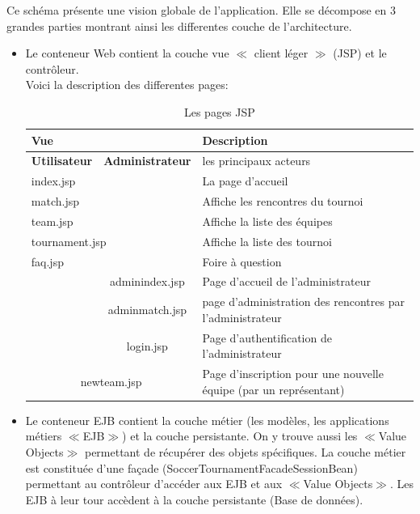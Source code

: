 \documentclass[10pt]{report}
\begin{document}
Ce schéma présente une vision globale de l'application. Elle se décompose en 3 grandes parties montrant ainsi les differentes couche de l'architecture.
\begin{itemize}
 \item Le conteneur Web contient la couche vue $\ll$ client léger $\gg$ (JSP) et le contrôleur.\\
 Voici la description des differentes pages:
 
\begin{table}[here]
    \begin{center}
	\begin{tabular}{|c|c|l|}
	\hline
	\multicolumn{2}{|l|}{\textbf{Vue}} & \textbf{Description}  \\
	\hline
	\textbf{Utilisateur}	& \textbf{Administrateur}& les principaux acteurs  \\
	\hline
	\multicolumn{2}{|l|}{index.jsp}	& La page d'accueil \\
	\hline
	\multicolumn{2}{|l|}{match.jsp}	& Affiche les rencontres du tournoi\\
	\hline
	\multicolumn{2}{|l|}{team.jsp}		& Affiche la liste des équipes\\
	\hline
	\multicolumn{2}{|l|}{tournament.jsp}	& Affiche la liste des tournoi\\
	\hline
	\multicolumn{2}{|l|}{faq.jsp} 		& Foire à question\\
	\hline
				& adminindex.jsp& Page d'accueil de l'administrateur\\
	\hline
				& adminmatch.jsp& page d'administration des rencontres par l'administrateur\\
	\hline
				& login.jsp& Page d'authentification de l'administrateur\\
	\hline
	\multicolumn{2}{|c|}{newteam.jsp}& Page d'inscription pour une nouvelle équipe (par un représentant)\\
	\hline
	\end{tabular}
    \end{center}
    \caption{\label{}Les pages JSP}
\end{table} 
 \item Le conteneur EJB contient la couche métier (les modèles, les applications métiers $\ll$EJB$\gg$) et la couche persistante. On y trouve aussi les
 $\ll$Value Objects$\gg$ permettant de récupérer des objets spécifiques. La couche métier est constituée d'une façade (SoccerTournamentFacadeSessionBean) permettant
 au contrôleur d'accéder aux EJB et aux  $\ll$Value Objects$\gg$. Les EJB à leur tour accèdent à la couche persistante (Base de données).
\end{itemize}
\end{document}
